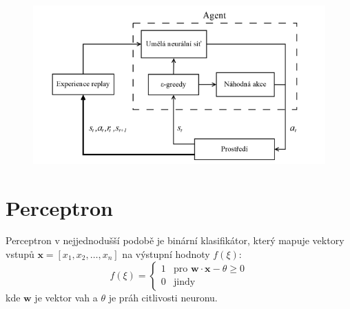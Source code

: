 \documentclass[12pt, a4paper,
twoside,        %
openright
]{report}
\begin{document}
\begin{figure}[h]
	\centering
	\includegraphics[width=0.8\linewidth, height=0.8\linewidth, keepaspectratio]{image/mod.png}
	
\end{figure}

\newpage
\section{Perceptron}
Perceptron v nejjednodušší podobě je binární klasifikátor, který mapuje vektory vstupů 
\(\mathbf{x} = [x_1, x_2, \ldots, x_n]\) na výstupní hodnoty \(f(\xi)\):
\[
f(\xi) = 
\begin{cases} 
	1 & \text{pro } \mathbf{w} \cdot \mathbf{x} - \theta \geq 0 \\
	0 & \text{jindy} 
\end{cases}
\]
kde \(\mathbf{w}\) je vektor vah a \(\theta\) je práh citlivosti neuronu.
\end{document}

